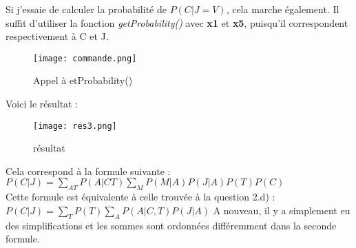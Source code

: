 \documentclass[12pt]{article}
\begin{document}
Si j'essaie de calculer la probabilité de $P(C|J=V)$, cela marche également. 
Il suffit d'utiliser la fonction \textit{getProbability()} avec \textbf{x1} et \textbf{x5}, puisqu'il correspondent respectivement à C et J.
\begin{figure}[H]
\begin{center}
	\texttt{[image: commande.png]}
	\caption{Appel à etProbability()}
\end{center}
\end{figure}
Voici le résultat : 
\begin{figure}[H]
\begin{center}
	\texttt{[image: res3.png]}
	\caption{résultat}
\end{center}
\end{figure}
Cela correspond à la formule suivante : \\ 
$P(C|J) = \sum_{A T} P(A|C T) \sum_{M} P(M|A) P(J|A) P(T) P(C) $ \\
Cette formule est équivalente à celle trouvée à la question 2.d) : \\
$P(C|J) = \sum_{T} P(T) \sum_{A} P(A|C, T) P(J|A)$
A nouveau, il y a simplement eu des simplifications et les sommes sont ordonnées différemment dans la seconde formule.
\\ \linebreak




%


%
\end{document}
